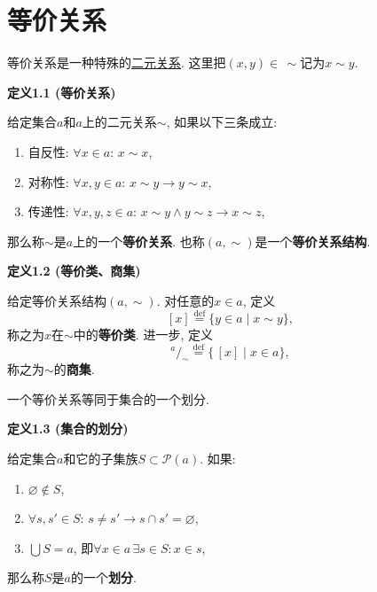 \documentclass[UTF8]{ctexart}
\begin{document}
\setlength{\abovedisplayskip}{1pt}
\setlength{\belowdisplayskip}{1pt}

\section{等价关系}

等价关系是一种特殊的\href{02 二元关系#nameddest=sec:定义1.1}{二元关系}.
这里把$(x,y)\in\,\sim$记为$x\sim y$.

\vspace{10pt}

\hypertarget{sec:定义1.1}{}
\noindent\textbf{定义1.1 (等价关系)}

给定集合$a$和$a$上的二元关系$\sim$, 如果以下三条成立:
\begin{enumerate}
    \item 自反性: $\forall x\in a:\,x\sim x$,
    \item 对称性: $\forall x,y\in a:\,x\sim y\to y\sim x$,
    \item 传递性: $\forall x,y,z\in a:\,x\sim y\land y\sim z\to x\sim z$,
\end{enumerate}
那么称$\sim$是$a$上的一个\textbf{等价关系}.
也称$(a,\sim)$是一个\textbf{等价关系结构}.

\vspace{10pt}

\hypertarget{sec:定义1.2}{}
\noindent\textbf{定义1.2 (等价类、商集)}

给定等价关系结构$(a,\sim)$. 对任意的$x\in a$, 定义
\[
    [x]\overset{\mathrm{def}}{=}\{y\in a\mid x\sim y\},
\]
称之为$x$在$\sim$中的\textbf{等价类}. 进一步, 定义
\[
    ^{\displaystyle a}\!/_{\displaystyle\sim}\overset{\mathrm{def}}{=}
    \{\,[x]\mid x\in a\},
\]
称之为$\sim$的\textbf{商集}.

\vspace{10pt}

一个等价关系等同于集合的一个划分.

\vspace{10pt}

\hypertarget{sec:定义1.3}{}
\noindent\textbf{定义1.3 (集合的划分)}

给定集合$a$和它的子集族$S\subset\mathcal{P}(a)$. 如果:
\begin{enumerate}
    \item $\varnothing\notin S$,
    \item $\forall s,s'\in S:\,s\neq s'\to s\cap s'=\varnothing$,
    \item $\displaystyle\bigcup S=a$, 即$\forall x\in a\,\exists s\in S:x\in s$,
\end{enumerate}
那么称$S$是$a$的一个\textbf{划分}.
\end{document}
